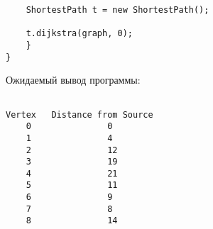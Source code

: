 \begin{tcolorbox}
\begin{verbatim}
	ShortestPath t = new ShortestPath();

	t.dijkstra(graph, 0);
	}
}
\end{verbatim}
\end{tcolorbox}

\vspace{\baselineskip}
Ожидаемый вывод программы:

\vspace{\baselineskip}
\begin{tcolorbox}
\begin{verbatim} 

Vertex	 Distance from Source
	0				0
	1				4
	2				12
	3				19
	4				21
	5				11
	6				9
	7				8
	8				14

\end{verbatim}
\end{tcolorbox}


